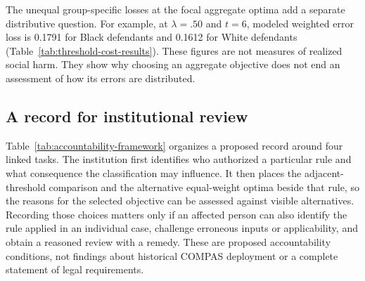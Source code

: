 \documentclass[11pt,letterpaper]{article}
\begin{document}
The unequal group-specific losses at the focal aggregate optima add a separate distributive question. For example, at $\lambda=.50$ and $t=6$, modeled weighted error loss is 0.1791 for Black defendants and 0.1612 for White defendants (Table~\ref{tab:threshold-cost-results}). These figures are not measures of realized social harm. They show why choosing an aggregate objective does not end an assessment of how its errors are distributed.

\subsection{A record for institutional review}

Table~\ref{tab:accountability-framework} organizes a proposed record around four linked tasks. The institution first identifies who authorized a particular rule and what consequence the classification may influence. It then places the adjacent-threshold comparison and the alternative equal-weight optima beside that rule, so the reasons for the selected objective can be assessed against visible alternatives. Recording those choices matters only if an affected person can also identify the rule applied in an individual case, challenge erroneous inputs or applicability, and obtain a reasoned review with a remedy. These are proposed accountability conditions, not findings about historical COMPAS deployment or a complete statement of legal requirements.
\end{document}
